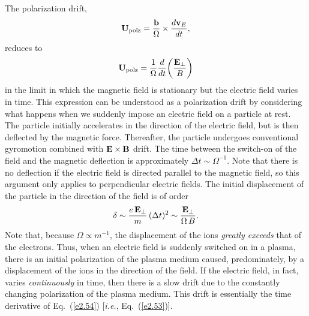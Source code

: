The polarization drift,
\begin{equation}
{\bf U}_{\rm polz} = \frac{{\bf b}}{{\Omega}}\times \frac{d{\bf v}_E}{dt},
\end{equation}
reduces to
\begin{equation}\label{e2.53}
{\bf U}_{\rm polz} = \frac{1}{{\Omega}} 
\frac{d}{dt}\!\left(\frac{{\bf E}_\perp}
{B}\right)
\end{equation}
in the limit in which the magnetic field is stationary but the electric
field varies in time. This expression can be understood as a polarization drift
by considering what happens when we suddenly impose an electric field on a
particle at rest. The particle initially accelerates in the direction of
the electric field, but is then deflected by the magnetic force. Thereafter,
the particle undergoes conventional gyromotion combined with
${\bf E}\times{\bf B}$ drift. The time
between the switch-on of the field and the magnetic deflection is approximately
${\Delta}t\sim {\Omega}^{-1}$. Note that there is no deflection if
the electric field is directed parallel to the magnetic field,
so this argument only applies to perpendicular electric fields. The initial
displacement of the particle in the direction of the field is of order 
\begin{equation}\label{e2.54}
{\bf \delta} \sim
\frac{e\,{\bf E}_{\perp}}{m}\,({\Delta} t)^2 \sim \frac{{\bf E}_\perp}{
{\Omega}\,B}.
\end{equation}
Note that, because ${\Omega}\propto m^{-1}$, the displacement of the
ions {\em greatly exceeds}\/ that of the electrons. 
Thus, when an electric field
is suddenly switched on in a plasma, there is an initial polarization of
the plasma medium caused, predominately, by a displacement of the ions in the direction of the
field. If the electric field, in fact, varies {\em continuously}\/
in time, then there is a slow drift due to the constantly changing polarization of the
plasma medium. This drift is essentially the time derivative of Eq.~(\ref{e2.54}) [{\em i.e.},
Eq.~(\ref{e2.53})].

